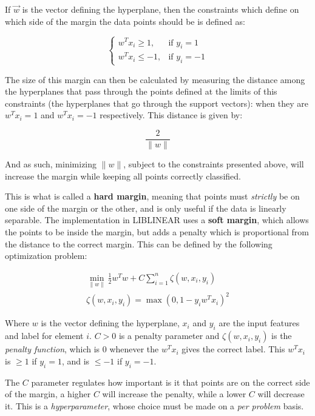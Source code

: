 \documentclass[epsfig,a4paper,11pt,titlepage,twoside,openany]{book}
\begin{document}
If $\vec{w}$ is the vector defining the hyperplane, then the constraints which define on which side of the margin the data points should be is defined as:

\begin{equation*}
    \begin{cases}
            w^T x_i \geq 1, & \text{if } y_i = 1 \\
            w^T x_i \leq -1, & \text{if } y_i = -1
    \end{cases} 
\end{equation*}

The size of this margin can then be calculated by measuring the distance among the hyperplanes that pass through the points defined at the limits of this constraints (the hyperplanes that go through the support vectors): when they are $w^T x_i = 1$ and $w^T x_i  = -1$ respectively. This distance is given by:

\begin{equation*}
    \frac{2}{\|w\|}
\end{equation*}

And as such, minimizing $\|w\|$, subject to the constraints presented above, will increase the margin while keeping all points correctly classified. 

This is what is called a \textbf{hard margin}, meaning that points must \textit{strictly} be on one side of the margin or the other, and is only useful if the data is linearly separable. The implementation in LIBLINEAR \cite{Fan:2008_liblinear} uses a \textbf{soft margin}, which allows the points to be inside the margin, but adds a penalty which is proportional from the distance to the correct margin. This can be defined by the following optimization problem:

\begin{align*}
    \min_{\|w\|} \frac{1}{2} w^T w + C \sum_{i=1}^n \zeta(w, x_i, y_i) \\ 
    \zeta(w, x_i, y_i) = \max(0, 1-y_i w^T x_i)^2
\end{align*}

Where $w$ is the vector defining the hyperplane, $x_i$ and $y_i$ are the input features and label for element $i$. $C > 0$ is a penalty parameter and $\zeta(w, x_i, y_i)$ is the \textit{penalty function}, which is 0 whenever the $w^T x_i$ gives the correct label. This $w^T x_i$ is $\geq 1$ if $y_i = 1$, and is $\leq -1$ if $y_i = -1$. 

The $C$ parameter regulates how important is it that points are on the correct side of the margin, a higher $C$ will increase the penalty, while a lower $C$ will decrease it. This is a \textit{hyperparameter}, whose choice must be made on a \textit{per problem} basis. 
\end{document}
